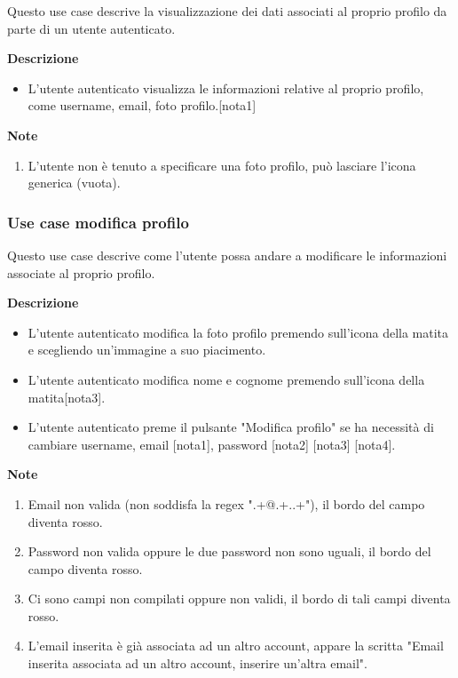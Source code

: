 \documentclass[a4paper,12pt]{article}
\begin{document}
Questo use case descrive la visualizzazione dei dati associati al proprio profilo da parte di un utente autenticato.

\textbf{Descrizione}
\begin{itemize} \setlength\itemsep{0.01em}
\item L'utente autenticato visualizza le informazioni relative al proprio profilo, come username, email, foto profilo.[nota1]
\end{itemize}

\textbf{Note}
\begin{enumerate} \setlength\itemsep{0.01em}
\item L'utente non è tenuto a specificare una foto profilo, può lasciare l'icona generica (vuota).
\end{enumerate}

\subsubsection*{Use case modifica profilo}

Questo use case descrive come l'utente possa andare a modificare le informazioni associate al proprio profilo.

\textbf{Descrizione}
\begin{itemize} \setlength\itemsep{0.01em}
\item L'utente autenticato modifica la foto profilo premendo sull'icona della matita e scegliendo un'immagine a suo piacimento.
\item L'utente autenticato modifica nome e cognome premendo sull'icona della matita[nota3].
\item L'utente autenticato preme il pulsante "Modifica profilo" se ha necessità di cambiare username, email [nota1], password [nota2] [nota3] [nota4].
\end{itemize}

\textbf{Note}
\begin{enumerate} \setlength\itemsep{0.01em}
\item Email non valida (non soddisfa la regex ".+@.+..+"), il bordo del campo diventa rosso.
\item Password non valida oppure le due password non sono uguali, il bordo del campo diventa rosso.
\item Ci sono campi non compilati oppure non validi, il bordo di tali campi diventa rosso.
\item L'email inserita è già associata ad un altro account, appare la scritta "Email inserita associata ad un altro account, inserire un'altra email".
\end{enumerate}
\end{document}
